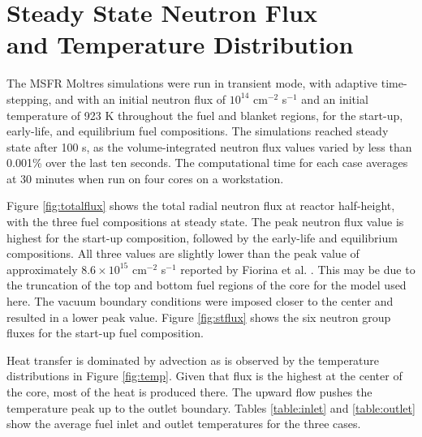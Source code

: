 \documentclass{anstrans}
\begin{document}
\section{Steady State Neutron Flux \\and Temperature Distribution}

	The \gls{MSFR} Moltres simulations were run in transient mode, with
	adaptive time-stepping, and with an
	initial neutron flux of $10^{14}$
	cm$^{-2}$ s$^{-1}$ and an initial temperature of 923 K throughout the
	fuel and blanket regions, for the start-up, early-life, and equilibrium
	fuel compositions. The simulations reached steady state after 100 s, as the
	volume-integrated neutron flux values varied by less than 0.001\% over the
	last ten seconds. The computational time for each case averages at 30
	minutes when run on four cores on a workstation.
	
	Figure \ref{fig:totalflux} shows the total radial neutron flux at reactor
	half-height, with the three fuel compositions at steady state. 
	The peak neutron flux value is highest for the start-up composition,
	followed by the early-life and equilibrium compositions. All three values
	are slightly lower than the peak value of approximately
	$8.6 \times 10^{15}$ cm$^{-2}$ s$^{-1}$ reported by Fiorina et al.
	\cite{fiorina_investigation_2013}. This may be due to the truncation of
	the top and bottom fuel regions of the core for the model used here.
	The vacuum boundary conditions were imposed closer to the center and
	resulted in a lower peak value. Figure \ref{fig:stflux} shows the six
	neutron group fluxes for the start-up fuel composition.
	
	Heat transfer is dominated by advection as is observed by the temperature
	distributions in Figure \ref{fig:temp}. Given that flux is the highest
	at the center of the core, most of the heat is produced there. The upward
	flow pushes the temperature peak up to the outlet boundary. Tables
	\ref{table:inlet} and \ref{table:outlet} show the average
	fuel inlet and outlet temperatures for the three cases.
\end{document}
